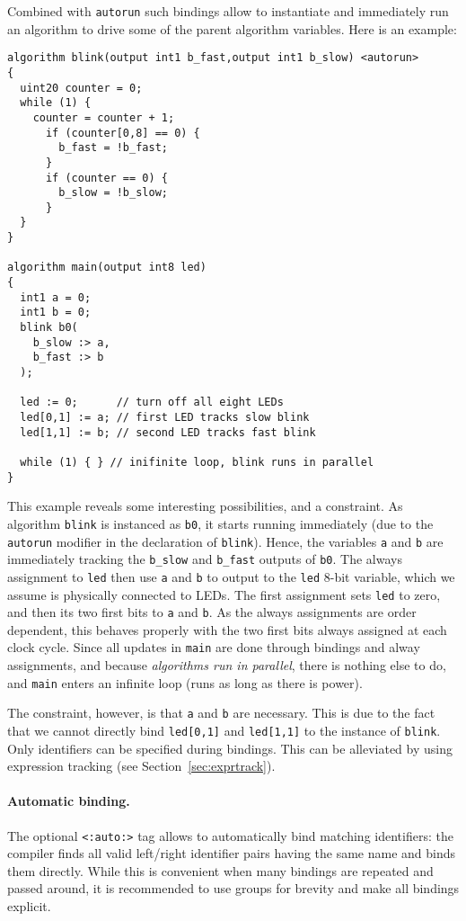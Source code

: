 \documentclass[a4]{article}
\begin{document}
Combined with \texttt{autorun} such bindings allow to instantiate and immediately run an algorithm to drive some of the parent algorithm variables. 
Here is an example:
%
\begin{verbatim}
algorithm blink(output int1 b_fast,output int1 b_slow) <autorun>
{
  uint20 counter = 0;
  while (1) {
    counter = counter + 1;
      if (counter[0,8] == 0) {
        b_fast = !b_fast;
      }
      if (counter == 0) {
        b_slow = !b_slow;
      }
  }
}

algorithm main(output int8 led)
{
  int1 a = 0;
  int1 b = 0;
  blink b0(
    b_slow :> a,
    b_fast :> b
  );

  led := 0;      // turn off all eight LEDs
  led[0,1] := a; // first LED tracks slow blink
  led[1,1] := b; // second LED tracks fast blink

  while (1) { } // inifinite loop, blink runs in parallel
}
\end{verbatim}
%
This example reveals some interesting possibilities, and a constraint.
As algorithm \texttt{blink} is instanced as \texttt{b0}, it starts running immediately (due to the \texttt{autorun} modifier in the declaration of \texttt{blink}). Hence, the variables \texttt{a} and \texttt{b}
are immediately tracking the \texttt{b\_slow} and \texttt{b\_fast} outputs of \texttt{b0}. The always assignment to \texttt{led} then use \texttt{a} and \texttt{b} to output to the \texttt{led} 8-bit variable, which we assume is physically connected to LEDs. The first assignment sets \texttt{led} to zero, and then its two first bits to \texttt{a} and \texttt{b}. As the always assignments are order dependent, this behaves properly with the two first bits always assigned at each clock cycle. Since all updates in \texttt{main} are done through bindings and alway assignments, and because \textit{algorithms run in parallel}, there is nothing else to do, and \texttt{main} enters an infinite loop (runs as long as there is power).

The constraint, however, is that \texttt{a} and \texttt{b} are necessary. This is due to the fact that we cannot directly bind \texttt{led[0,1]} and \texttt{led[1,1]} to the instance of \texttt{blink}. Only identifiers can be specified during bindings. This can be alleviated by using expression tracking (see Section~\ref{sec:exprtrack}).

\paragraph{Automatic binding.}
The optional \texttt{<:auto:>} tag allows to automatically bind matching identifiers:
the compiler finds all valid left/right identifier pairs having the same name and
binds them directly. While this is convenient when many bindings are repeated and passed
around, it is recommended to use groups for brevity and make all bindings explicit. 
\end{document}
